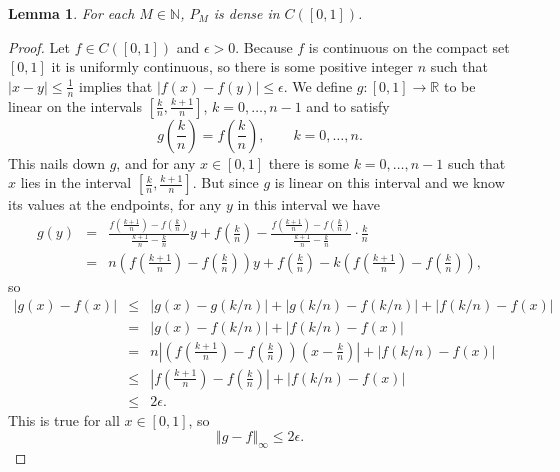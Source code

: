 \documentclass{article}
\newcommand{\norm}[1]{\left\Vert #1 \right\Vert}
\newtheorem{lemma}[theorem]{Lemma}
\theoremstyle{definition}
\begin{document}
\begin{lemma}
For each $M \in \mathbb{N}$, $P_M$ is dense in $C([0,1])$. 
\end{lemma}
\begin{proof}
Let $f \in C([0,1])$ and $\epsilon>0$. Because $f$ is continuous on the compact set $[0,1]$ it is uniformly continuous, so there is some
positive integer $n$ such that $|x-y| \leq \frac{1}{n}$ implies that $|f(x)-f(y)| \leq \epsilon$. We define $g:[0,1] \to \mathbb{R}$
to be linear on the intervals $[\frac{k}{n},\frac{k+1}{n}]$, $k=0,\ldots,n-1$ and to satisfy
\[
g\left(\frac{k}{n}\right)=f\left(\frac{k}{n}\right), \qquad k=0,\ldots,n.
\]
This nails down $g$, and for any $x \in [0,1]$ there is some $k=0,\ldots,n-1$ such that $x$ lies in the interval $[\frac{k}{n},  \frac{k+1}{n}]$.
But since $g$ is linear on this interval and we know its values at the endpoints, for any $y$ in this interval we have
\begin{eqnarray*}
g(y)& =& \frac{f\left(\frac{k+1}{n}\right)-f\left(\frac{k}{n}\right)}{\frac{k+1}{n}-\frac{k}{n}} y + f\left(\frac{k}{n}\right)-
 \frac{f\left(\frac{k+1}{n}\right)-f\left(\frac{k}{n}\right)}{\frac{k+1}{n}-\frac{k}{n}} \cdot \frac{k}{n}\\
 &=&n\left(f\left(\frac{k+1}{n}\right)-f\left(\frac{k}{n}\right)\right)y +f\left(\frac{k}{n}\right) - k\left(f\left(\frac{k+1}{n}\right)-f\left(\frac{k}{n}\right)\right),
\end{eqnarray*}
so 
\begin{eqnarray*}
|g(x)-f(x)| &\leq& |g(x)-g(k/n)|+|g(k/n)-f(k/n)| +|f(k/n)-f(x)|\\
&=&|g(x)-f(k/n)|+|f(k/n)-f(x)|\\
&=&n\left|\left(f\left(\frac{k+1}{n}\right)-f\left(\frac{k}{n}\right)\right)\left(x- \frac{k}{n}\right)\right|+|f(k/n)-f(x)|\\
&\leq&\left|f\left(\frac{k+1}{n}\right)-f\left(\frac{k}{n}\right)\right|+|f(k/n)-f(x)|\\
&\leq&2\epsilon.
\end{eqnarray*}
This is true for all $x \in [0,1]$, so
\[
\norm{g-f}_\infty \leq 2\epsilon.
\]


\end{proof}
\end{document}
